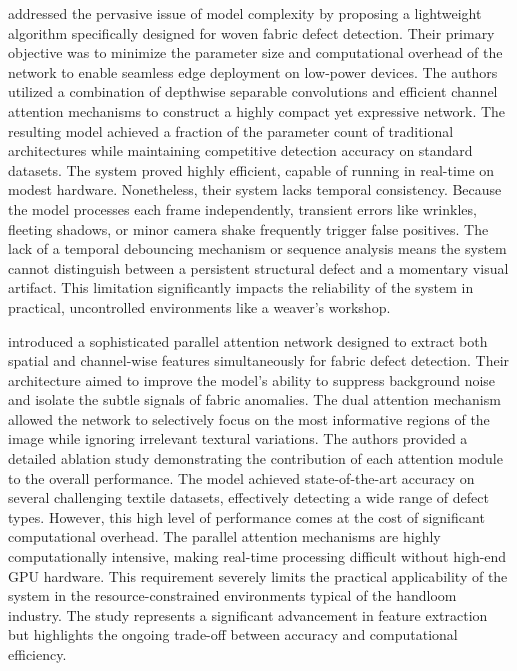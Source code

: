 \documentclass{ieeeaccess}
\begin{document}
\cite{b7} addressed the pervasive issue of model complexity by proposing a lightweight algorithm specifically designed for woven fabric defect detection. Their primary objective was to minimize the parameter size and computational overhead of the network to enable seamless edge deployment on low-power devices. The authors utilized a combination of depthwise separable convolutions and efficient channel attention mechanisms to construct a highly compact yet expressive network. The resulting model achieved a fraction of the parameter count of traditional architectures while maintaining competitive detection accuracy on standard datasets. The system proved highly efficient, capable of running in real-time on modest hardware. Nonetheless, their system lacks temporal consistency. Because the model processes each frame independently, transient errors like wrinkles, fleeting shadows, or minor camera shake frequently trigger false positives. The lack of a temporal debouncing mechanism or sequence analysis means the system cannot distinguish between a persistent structural defect and a momentary visual artifact. This limitation significantly impacts the reliability of the system in practical, uncontrolled environments like a weaver's workshop.

\cite{b8} introduced a sophisticated parallel attention network designed to extract both spatial and channel-wise features simultaneously for fabric defect detection. Their architecture aimed to improve the model's ability to suppress background noise and isolate the subtle signals of fabric anomalies. The dual attention mechanism allowed the network to selectively focus on the most informative regions of the image while ignoring irrelevant textural variations. The authors provided a detailed ablation study demonstrating the contribution of each attention module to the overall performance. The model achieved state-of-the-art accuracy on several challenging textile datasets, effectively detecting a wide range of defect types. However, this high level of performance comes at the cost of significant computational overhead. The parallel attention mechanisms are highly computationally intensive, making real-time processing difficult without high-end GPU hardware. This requirement severely limits the practical applicability of the system in the resource-constrained environments typical of the handloom industry. The study represents a significant advancement in feature extraction but highlights the ongoing trade-off between accuracy and computational efficiency.
\end{document}
